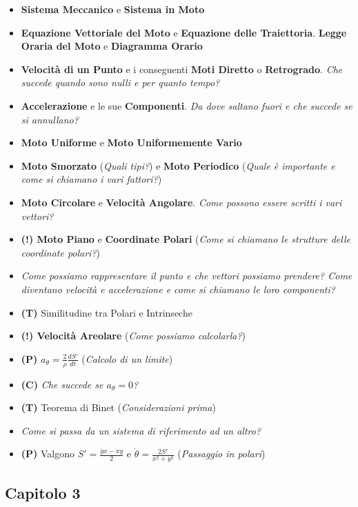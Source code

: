 \documentclass[11pt,a4paper,twoside]{article}
\begin{document}
\begin{itemize}
	\item \textbf{Sistema Meccanico} e \textbf{Sistema in Moto}
	\item \textbf{Equazione Vettoriale del Moto} e \textbf{Equazione delle Traiettoria}. \textbf{Legge Oraria del Moto} e \textbf{Diagramma Orario}
	\item \textbf{Velocità di un Punto} e i conseguenti \textbf{Moti Diretto} o \textbf{Retrogrado}. \textit{Che succede quando sono nulli e per quanto tempo?}
	\item \textbf{Accelerazione} e le sue \textbf{Componenti}. \textit{Da dove saltano fuori e che succede se si annullano?}
	\item \textbf{Moto Uniforme} e \textbf{Moto Uniformemente Vario}
	\item \textbf{Moto Smorzato} (\textit{Quali tipi?}) e \textbf{Moto Periodico} (\textit{Quale è importante e come si chiamano i vari fattori?})
	\item \textbf{Moto Circolare} e \textbf{Velocità Angolare}. \textit{Come possono essere scritti i vari vettori?}
	\item \textbf{(!) Moto Piano} e \textbf{Coordinate Polari} (\textit{Come si chiamano le strutture delle coordinate polari?})
	\item \textit{Come possiamo rappresentare il punto e che vettori possiamo prendere? Come diventano velocità e accelerazione e come si chiamano le loro componenti?}
	\item \textbf{(T)} Similitudine tra Polari e Intrinseche
	\item \textbf{(!) Velocità Areolare} (\textit{Come possiamo calcolarla?})
	\item \textbf{(P)} $a_\theta = \frac{2}{\rho} \frac{dS'}{dt}$ (\textit{Calcolo di un limite})
	\item \textbf{(C)} \textit{Che succede se $a_\theta=0$?}
	\item \textbf{(T)} Teorema di Binet (\textit{Considerazioni prima})
	\item \textit{Come si passa da un sistema di riferimento ad un altro?}
	\item \textbf{(P)} Valgono $S' = \frac{\dot yx - \dot xy}{2}$ e $\dot \theta = \frac{2S'}{x^2 + y^2}$ (\textit{Passaggio in polari})
\end{itemize}

\subsection*{Capitolo 3}
\end{document}
